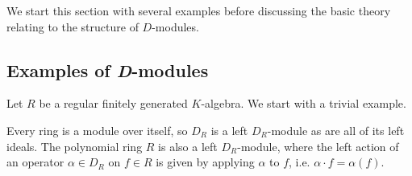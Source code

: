 We start this section with several examples before discussing the basic theory relating to the structure of $D$-modules.

\subsection{Examples of \emph{D}-modules}

Let $R$ be a regular finitely generated $K$-algebra. We start with a trivial example.

\begin{example}\label{example:d-mod-trivial-ring-case}
	Every ring is a module over itself, so $D_{R}$ is a left $D_{R}$-module as are all of its left ideals. The polynomial ring $R$ is also a left $D_{R}$-module, where the left action of an operator $\alpha \in D_{R}$ on $f \in R$ is given by applying $\alpha$ to $f$, i.e. $\alpha\cdot f = \alpha(f)$. 
\end{example}

